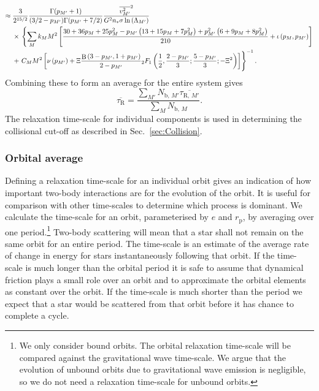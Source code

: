 \documentclass[useAMS,usedcolumn,usegraphicx,usenatbib]{mn2e}
\newcommand{\secref}[1]{Sec.~\ref{sec:#1}}
\DeclareMathOperator{\Beta}{B}
\newcommand{\sub}[1]{\ensuremath{_\mathrm{#1}}}
\newcommand{\recip}[1]{\ensuremath{\dfrac{1}{#1}}}
\begin{document}
\begin{onecolumn}
\begin{align}
 \approx {} & \frac{3}{2^{15/2}}\frac{\Gamma(p_{M'} + 1)}{(3/2 - p_{M'})\Gamma(p_{M'} + 7/2)}\frac{\overline{v_{M'}^2}^2}{G^2n_\ast\sigma\ln\left(\Lambda_{M'}\right)} \nonumber \\* 
  & \times {} \left\{\sum_M k_M M^2 \left[ \frac{30 + 36p_M + 25p_M^2 - p_{M'}\left(13 + 15p_M + 7 p_M^2\right) + p_{M'}^2\left(6 + 9p_M + 8p_M^2\right)}{210} + \iota \left(p_M,p_{M'}\right)\right] \right. \nonumber \\*
  & + \left. \vphantom{ \left[ \frac{p_{M'}^2\left(6 + 9p_M + 8p_M^2\right)}{210}\right]} C_M M^2 \left[\nu\left(p_{M'}\right) + \Xi\frac{\Beta\left(3-p_{M'},1+p_{M'}\right)}{2-p_{M'}}{_2F_1}\left(\recip{2},\frac{2-p_{M'}}{3};\frac{5-p_{M'}}{3};-\Xi^2\right)\right]\right\}^{-1}.
\end{align}
Combining these to form an average for the entire system gives
\begin{equation}
\overline{\tau_{\mathrm{R}}} = \frac{\sum_{M'}N_{\mathrm{b,}\,M'}\overline{\tau_{\mathrm{R,}\,M'}}}{\sum_{M}N_{\mathrm{b,}\,M}}.
\label{eq:system-relax}
\end{equation}
The relaxation time-scale for individual components is used in determining the collisional cut-off as described in \secref{Collision}.

\subsubsection{Orbital average}\label{sec:orbital-ave}

Defining a relaxation time-scale for an individual orbit gives an indication of how important two-body interactions are for the evolution of the orbit. It is useful for comparison with other time-scales to determine which process is dominant. We calculate the time-scale for an orbit, parameterised by $e$ and $r\sub{p}$, by averaging over one period.\footnote{We only consider bound orbits. The orbital relaxation time-scale will be compared against the gravitational wave time-scale. We argue that the evolution of unbound orbits due to gravitational wave emission is negligible, so we do not need a relaxation time-scale for unbound orbits.}  Two-body scattering will mean that a star shall not remain on the same orbit for an entire period. The time-scale is an estimate of the average rate of change in energy for stars instantaneously following that orbit. If the time-scale is much longer than the orbital period it is safe to assume that dynamical friction plays a small role over an orbit and to approximate the orbital elements as constant over the orbit. If the time-scale is much shorter than the period we expect that a star would be scattered from that orbit before it has chance to complete a cycle.


\end{onecolumn}
\end{document}
